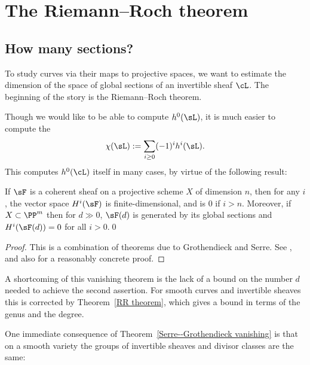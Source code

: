 

\chapter{The Riemann--Roch theorem}\label{RiemannRochChapter}

\section{How many sections?}

To study curves via their maps to projective spaces, we want to estimate the dimension of the space of global
sections of an invertible sheaf $\cL$. The beginning
of the story is the Riemann--Roch theorem.

Though we would like to be able to compute $h^0(\sL)$, it is much
easier to compute the 
%
$$
\chi(\sL):= \sum_{i\geq 0} (-1)^i h^i(\sL).
$$
This computes $h^0(\cL)$ itself in many cases, by virtue of the following result:

\begin{theorem}
\label{Serre--Grothendieck vanishing}
%
%
If $\sF$ is a coherent sheaf on a projective scheme $X$ of dimension $n$, then for any $i$, the vector space $H^i(\sF)$ is finite-dimensional, and is 0 if  $i> n$. Moreover,
if $X\subset \PP^m$ then for $d\gg 0$, $\sF(d)$ is generated by its global sections and $H^i(\sF(d)) = 0$ for all $i>0$.\qed
\end{theorem}

\begin{proof}
This is a combination of 
theorems due to Grothendieck and Serre. See
\cite[Theorems III.2.7 and III.5.2]{Hartshorne1977}, 
and
also \cite{Serre1955} for a 
reasonably
concrete proof.
\end{proof}

A 
shortcoming
of this vanishing theorem is the lack of a bound on the number $d$ needed to achieve the second assertion. For smooth curves
and invertible sheaves
this is corrected by Theorem~\ref{RR theorem}, which gives a bound in terms of the genus and the degree.

One immediate consequence of Theorem~\ref{Serre--Grothendieck vanishing} is that on a smooth variety the groups of invertible sheaves and divisor classes are the same:

